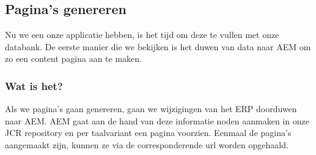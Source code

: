 
	\subsection{Pagina's genereren}
	Nu we een onze applicatie hebben, is het tijd om deze te vullen met onze databank. De eerste manier die we bekijken is het duwen van data naar AEM om zo een content pagina aan te maken.
	\subsubsection{Wat is het?}
	Als we pagina's gaan genereren, gaan we wijzigingen van het ERP doorduwen naar AEM. AEM gaat aan de hand van deze informatie noden aanmaken in onze JCR repository en per taalvariant een pagina voorzien. Eenmaal de pagina's aangemaakt zijn, kunnen ze via de corresponderende url worden opgehaald.
